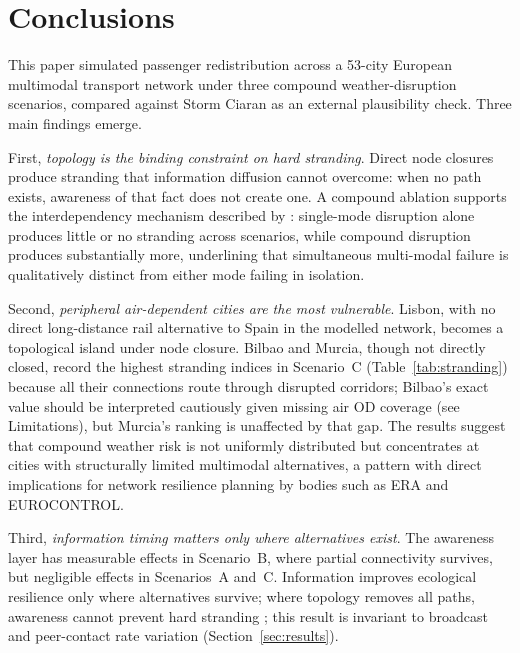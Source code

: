 \documentclass[12pt,a4paper]{article}
\begin{document}
\section{Conclusions}
\label{sec:conclusions}

This paper simulated passenger redistribution across a 53-city European multimodal
transport network under three compound weather-disruption scenarios, compared against
Storm Ciaran as an external plausibility check.
Three main findings emerge.

First, \emph{topology is the binding constraint on hard stranding}.
Direct node closures produce stranding that information diffusion cannot overcome:
when no path exists, awareness of that fact does not create one.
A compound ablation supports the interdependency mechanism described by \citet{Buldyrev2010}:
single-mode disruption alone produces little or no stranding across scenarios,
while compound disruption produces substantially more, underlining that simultaneous
multi-modal failure is qualitatively distinct from either mode failing in isolation.

Second, \emph{peripheral air-dependent cities are the most vulnerable}.
Lisbon, with no direct long-distance rail alternative to Spain in the modelled network,
becomes a topological island under node closure.
Bilbao and Murcia, though not directly closed, record the highest stranding indices
in Scenario~C (Table~\ref{tab:stranding}) because all their connections route through
disrupted corridors; Bilbao's exact value should be interpreted cautiously given missing
air OD coverage (see Limitations), but Murcia's ranking is unaffected by that gap.
The results suggest that compound weather risk is not uniformly distributed but
concentrates at cities with structurally limited multimodal alternatives, a pattern
with direct implications for network resilience planning by bodies such as ERA and EUROCONTROL.

Third, \emph{information timing matters only where alternatives exist}.
The awareness layer has measurable effects in Scenario~B, where partial connectivity survives,
but negligible effects in Scenarios~A and~C.
Information improves ecological resilience only where alternatives survive; where topology
removes all paths, awareness cannot prevent hard stranding \citep{Reggiani2015};
this result is invariant to broadcast and peer-contact rate variation (Section~\ref{sec:results}).
\end{document}
